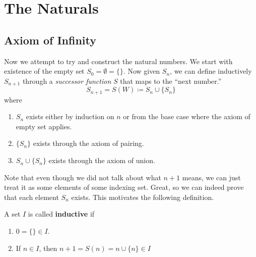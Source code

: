 \section{The Naturals} 

\subsection{Axiom of Infinity}

  Now we attempt to try and construct the natural numbers. We start with existence of the empty set $S_0 = \emptyset = \{\}$. Now given $S_n$, we can define inductively $S_{n+1}$ through a \textit{successor function} $S$ that maps to the ``next number.''
  \begin{equation}
    S_{n+1} = S(W) \coloneqq S_n \cup \{S_n\}
  \end{equation}
  where 
  \begin{enumerate}
    \item $S_n$ exists either by induction on $n$ or from the base case where the axiom of empty set applies. 
    \item $\{S_n\}$ exists through the axiom of pairing. 
    \item $S_n \cup \{S_n\}$ exists through the axiom of union. 
  \end{enumerate} 
  Note that even though we did not talk about what $n+1$ means, we can just treat it as some elements of some indexing set. Great, so we can indeed prove that each element $S_n$ exists. This motivates the following definition. 

  \begin{definition}
    A set $I$ is called \textbf{inductive} if 
    \begin{enumerate}
      \item $0 = \{\} \in I$. 
      \item If $n \in I$, then $n + 1 = S(n) = n \cup \{n\} \in I$
    \end{enumerate} 
  \end{definition}

